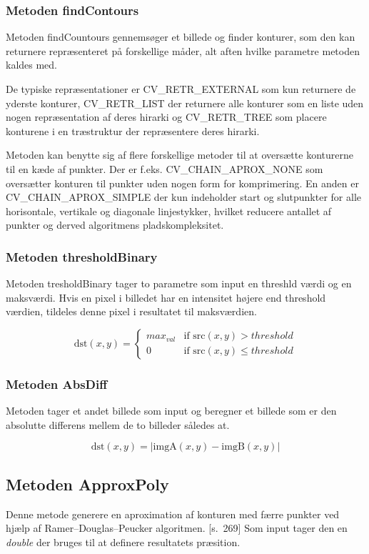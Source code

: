 \subsubsection{Metoden findContours}
Metoden findCountours gennemsøger et billede og finder konturer, som den kan returnere 
repræsenteret på forskellige måder, alt aften hvilke parametre metoden kaldes med.

De typiske repræsentationer er CV\_RETR\_EXTERNAL som kun returnere de yderste konturer,
CV\_RETR\_LIST der returnere alle konturer som en liste uden nogen repræsentation af deres hirarki og
CV\_RETR\_TREE som placere konturene i en træstruktur der repræsentere deres hirarki.

Metoden kan benytte sig af flere forskellige metoder til at oversætte konturerne til en kæde af punkter. 
Der er f.eks. CV\_CHAIN\_APROX\_NONE som oversætter konturen til punkter uden nogen form for komprimering.
En anden er CV\_CHAIN\_APROX\_SIMPLE der kun indeholder start og slutpunkter for alle horisontale,
vertikale og diagonale linjestykker, hvilket reducere antallet af punkter og derved algoritmens
pladskompleksitet.
\cite{EmguCVLibDoc}

\subsubsection{Metoden thresholdBinary}
Metoden tresholdBinary tager to parametre som input en threshld værdi og en maksværdi.
Hvis en pixel i billedet har en intensitet højere end threshold værdien, tildeles denne pixel i resultatet til maksværdien.\cite{EmguCVLibDoc}

$$\text{dst}(x,y) = 
\begin{cases} 
max_{val} & \text{if src}(x,y) > threshold \\
0 & \text{if src}(x,y) \leq threshold
\end{cases}
$$

\subsubsection{Metoden AbsDiff}
Metoden tager et andet billede som input og beregner et billede
som er den absolutte differens mellem de to billeder således at.
\cite{EmguCVLibDoc}

$$ \text{dst}(x,y) = \vert \text{imgA}(x,y) - \text{imgB}(x,y) \vert $$

\subsection{Metoden ApproxPoly}
Denne metode generere en aproximation af konturen med færre punkter ved hjælp af Ramer–Douglas–Peucker algoritmen.
\cite{opencvrefman}[s.~269]
Som input tager den en \emph{double} der bruges til at definere resultatets præsition.
\cite{EmguCVLibDoc}
